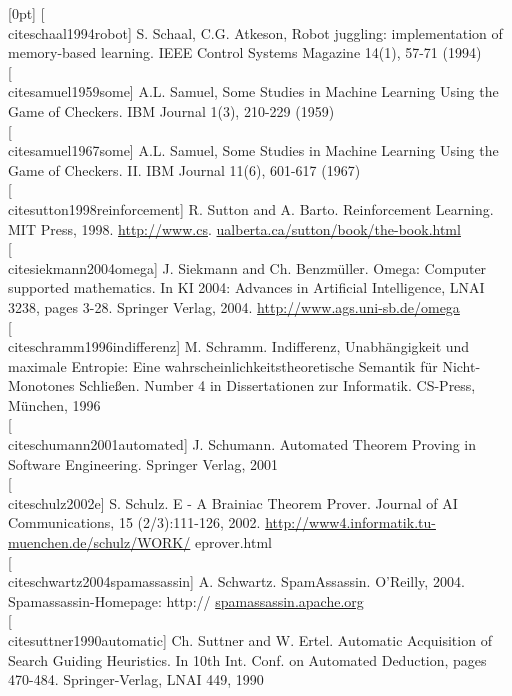 \documentclass[10pt]{book}
\begin{document}
[0pt]
[\\cite{schaal1994robot}] S. Schaal, C.G. Atkeson, Robot juggling: implementation of memory-based learning. IEEE Control Systems Magazine 14(1), 57-71 (1994)\\[0pt]
[\\cite{samuel1959some}] A.L. Samuel, Some Studies in Machine Learning Using the Game of Checkers. IBM Journal 1(3), 210-229 (1959)\\[0pt]
[\\cite{samuel1967some}] A.L. Samuel, Some Studies in Machine Learning Using the Game of Checkers. II. IBM Journal 11(6), 601-617 (1967)\\[0pt]
[\\cite{sutton1998reinforcement}] R. Sutton and A. Barto. Reinforcement Learning. MIT Press, 1998. \href{http://www.cs}{http://www.cs}. \href{http://ualberta.ca/sutton/book/the-book.html}{ualberta.ca/sutton/book/the-book.html}\\[0pt]
[\\cite{siekmann2004omega}] J. Siekmann and Ch. Benzmüller. Omega: Computer supported mathematics. In KI 2004: Advances in Artificial Intelligence, LNAI 3238, pages 3-28. Springer Verlag, 2004. \href{http://www.ags.uni-sb.de/omega}{http://www.ags.uni-sb.de/omega}\\[0pt]
[\\cite{schramm1996indifferenz}] M. Schramm. Indifferenz, Unabhängigkeit und maximale Entropie: Eine wahrscheinlichkeitstheoretische Semantik für Nicht-Monotones Schließen. Number 4 in Dissertationen zur Informatik. CS-Press, München, 1996\\[0pt]
[\\cite{schumann2001automated}] J. Schumann. Automated Theorem Proving in Software Engineering. Springer Verlag, 2001\\[0pt]
[\\cite{schulz2002e}] S. Schulz. E - A Brainiac Theorem Prover. Journal of AI Communications, 15 (2/3):111-126, 2002. \href{http://www4.informatik.tu-muenchen.de/schulz/WORK/}{http://www4.informatik.tu-muenchen.de/schulz/WORK/} eprover.html\\[0pt]
[\\cite{schwartz2004spamassassin}] A. Schwartz. SpamAssassin. O'Reilly, 2004. Spamassassin-Homepage: http:// \href{http://spamassassin.apache.org}{spamassassin.apache.org}\\[0pt]
[\\cite{suttner1990automatic}] Ch. Suttner and W. Ertel. Automatic Acquisition of Search Guiding Heuristics. In 10th Int. Conf. on Automated Deduction, pages 470-484. Springer-Verlag, LNAI 449, 1990\\[0pt]
\end{document}
